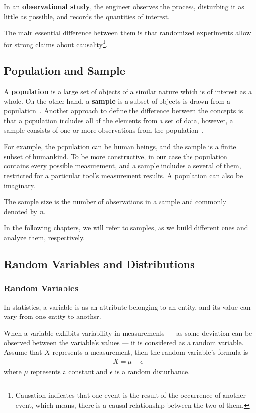 In an \textbf{observational study}, the engineer observes the process, disturbing it as little
as possible, and records the quantities of interest.

The main essential difference between them is that randomized experiments allow for strong claims about causality\footnote{Causation indicates that one event is the result of the occurrence of another event, which means, there is a causal relationship between the two of them.}.

\subsection{Population and Sample}

A \textbf{population} is a large set of objects of a similar nature which is of interest as a whole. On the other hand, a \textbf{sample} is a subset of objects is drawn from a population~\cite{sample1}. Another approach to define the difference between the concepts is that a population includes all of the elements from a set of data, however, a sample consists of one or more observations from the population~\cite{sample2}.

For example, the population can be human beings, and the sample is a finite subset of humankind. To be more constructive, in our case the population contains every possible measurement, and a sample includes a several of them, restricted for a particular tool's measurement results. A population can also be imaginary. 

The sample size is the number of observations in a sample and commonly denoted by \textit{n}.

In the following chapters, we will refer to samples, as we build different ones and analyze them, respectively.

\subsection{Random Variables and Distributions}

\subsubsection{Random Variables}
In statistics, a variable is as an attribute belonging to an entity, and its value can vary from one entity to another.

When a variable exhibits variability in measurements --- as some deviation can be observed between the variable's values --- it is considered as a random variable. Assume that $X$ represents a measurement, then the random variable's formula is
\begin{align} \label{eq:random_variable}
	X = \mu + \epsilon
\end{align} 
where $\mu$ represents a constant and $\epsilon$ is a random disturbance.

